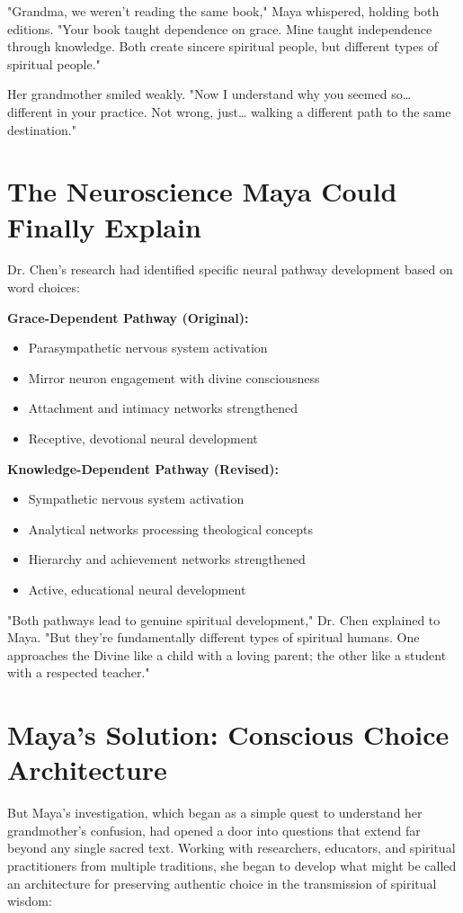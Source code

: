 \documentclass[11pt,twoside]{book}
\begin{document}
"Grandma, we weren't reading the same book," Maya whispered, holding both editions. "Your book taught dependence on grace. Mine taught independence through knowledge. Both create sincere spiritual people, but different types of spiritual people."

Her grandmother smiled weakly. "Now I understand why you seemed so\ldots{} different in your practice. Not wrong, just\ldots{} walking a different path to the same destination."
\section*{The Neuroscience Maya Could Finally Explain}
\label{sec:org02c9c91}

Dr. Chen's research had identified specific neural pathway development based on word choices:

\textbf{\textbf{Grace-Dependent Pathway (Original):}}
\begin{itemize}
\item Parasympathetic nervous system activation
\item Mirror neuron engagement with divine consciousness
\item Attachment and intimacy networks strengthened
\item Receptive, devotional neural development
\end{itemize}

\textbf{\textbf{Knowledge-Dependent Pathway (Revised):}}
\begin{itemize}
\item Sympathetic nervous system activation
\item Analytical networks processing theological concepts
\item Hierarchy and achievement networks strengthened
\item Active, educational neural development
\end{itemize}

"Both pathways lead to genuine spiritual development," Dr. Chen explained to Maya. "But they're fundamentally different types of spiritual humans. One approaches the Divine like a child with a loving parent; the other like a student with a respected teacher."
\section*{Maya's Solution: Conscious Choice Architecture}
\label{sec:org070a4ec}

But Maya's investigation, which began as a simple quest to understand her grandmother's confusion, had opened a door into questions that extend far beyond any single sacred text. Working with researchers, educators, and spiritual practitioners from multiple traditions, she began to develop what might be called an architecture for preserving authentic choice in the transmission of spiritual wisdom:
\end{document}
